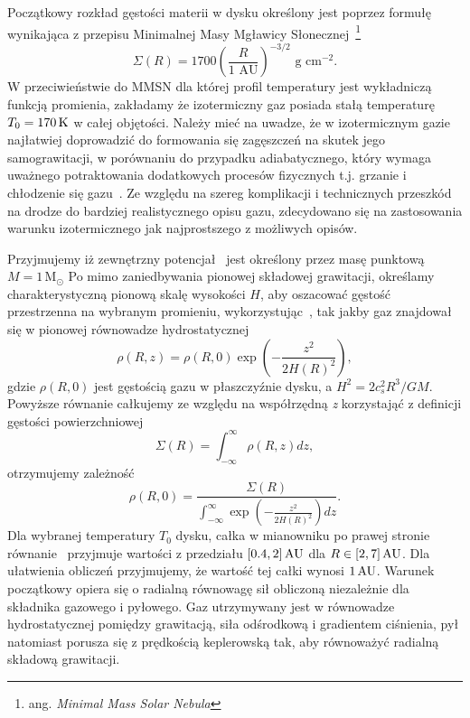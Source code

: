 \par Początkowy rozkład gęstości materii w dysku określony jest poprzez formułę
wynikająca z przepisu Minimalnej Masy Mgławicy Słonecznej~\footnote{ang.
\emph{Minimal Mass Solar Nebula}}~\cite{H81}
\begin{equation}\label{eq:mmsn}
   \Sigma(R) = 1700 \left(\frac{R}{1\textrm{ AU}}\right)^{-3/2} 
   \textrm{ g cm}^{-2}.
\end{equation}
W przeciwieństwie do MMSN dla której profil temperatury jest wykładniczą funkcją
promienia, zakładamy że izotermiczny gaz posiada stałą temperaturę $T_0 = 170\hbox{$\thinspace\textrm{K}$}$
w całej objętości. Należy mieć na uwadze, że w izotermicznym gazie najłatwiej
doprowadzić do formowania się zagęszczeń na skutek jego samograwitacji, w
porównaniu do przypadku adiabatycznego, który wymaga uważnego potraktowania
dodatkowych procesów fizycznych t.j. grzanie i chłodzenie się gazu~\cite{Nel00}.
Ze względu na szereg komplikacji i technicznych przeszkód na drodze do bardziej
realistycznego opisu gazu, zdecydowano się na zastosowania warunku
izotermicznego jak najprostszego z możliwych opisów.
\par Przyjmujemy iż zewnętrzny potencjał~ jest określony przez
masę punktową $M=1\,\textrm{M}_\odot$ Po mimo zaniedbywania pionowej składowej
grawitacji, określamy charakterystyczną pionową skalę wysokości $H$, aby
oszacować gęstość przestrzenna na wybranym promieniu,
wykorzystując~, tak jakby gaz znajdował się w pionowej równowadze
hydrostatycznej
%
\begin{equation}\label{eq:rhoR}
   \rho(R,z) =  \rho(R,0) \exp\left(-\frac{z^2}{2H(R)^2}\right),
\end{equation}
gdzie $\rho(R,0)$ jest gęstością gazu w płaszczyźnie dysku, a $H^2 = 2 c_s^2 R^3/
GM$.
%
Powyższe równanie całkujemy ze względu na współrzędną \emph{z} korzystająć z
definicji gęstości powierzchniowej
\begin{equation} \label{eq:sigmaR}
   \Sigma(R) = \int_{-\infty}^\infty \rho(R,z) dz,
\end{equation}
%
otrzymujemy zależność
\begin{equation}
   \label{eq:rho}
    \rho(R,0) = \frac{\Sigma(R) }{\int_{-\infty}^\infty
   \exp\left(-\frac{z^2}{2H(R)^2}\right) dz}.
\end{equation}
Dla wybranej temperatury $T_0$ dysku, całka w mianowniku po prawej stronie
równanie~ przyjmuje wartości z przedziału $[0.4,2]\hbox{$\thinspace\textrm{AU}$}$ dla $R \in
[2,7]\hbox{$\thinspace\textrm{AU}$}$. Dla ułatwienia obliczeń przyjmujemy, że wartość tej całki wynosi $1\hbox{$\thinspace\textrm{AU}$}$.
Warunek początkowy opiera się o radialną równowagę sił obliczoną niezależnie dla
składnika gazowego i pyłowego. Gaz utrzymywany jest w równowadze hydrostatycznej
pomiędzy grawitacją, siła odśrodkową i gradientem ciśnienia, pył natomiast
porusza się z prędkością keplerowską tak, aby równoważyć radialną składową
grawitacji.

